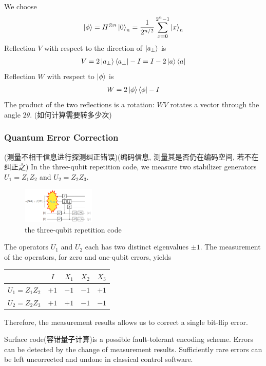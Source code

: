 We choose
\begin{align*}
    \ket{\phi}=H^{\otimes n}\ket{0}_n=\frac{1}{2^{n/2}}\sum_{x=0}^{2^n-1}\ket{x}_n
\end{align*}
Reflection $V$ with respect to the direction of $\ket{a_\perp}$ is 
\begin{align*}
    V=2\ket{a_\perp}\bra{a_\perp}-I=I-2\ket{a}\bra{a}
\end{align*}
Reﬂection $W$ with respect to $\ket{\phi}$ is
\begin{align*}
    W=2\ket{\phi}\bra{\phi}-I
\end{align*}
The product of the two reﬂections is a rotation: $WV$ rotates a vector through the angle $2\theta$. (如何计算需要转多少次)

\subsubsection{Quantum Error Correction}
(测量不相干信息进行探测纠正错误)(编码信息, 测量其是否仍在编码空间, 若不在纠正之)
In the three-qubit repetition code, we measure two stabilizer generators $U_1=Z_1Z_2$ and $U_2=Z_2Z_3$. 

\begin{figure}[!htb]
    \centering
    \includegraphics[width=0.309\textwidth]{pic/Review/the three-qubit repetition code}
    \caption{the three-qubit repetition code}
\end{figure}

The operators $U_1$ and $U_2$ each has two distinct eigenvalues $\pm1$. The measurement of the operators, for zero and one-qubit errors, yields
\begin{table}[htb]
    \centering
    \begin{tabular}[c]{ccccc}\toprule
        & $I$ & $X_1$ & $X_2$ & $X_3$\\ \midrule
        $U_1=Z_1Z_2$ & $+1$ & $-1$ & $-1$ & $+1$\\ 
        $U_2=Z_2Z_3$ & $+1$ & $+1$ & $-1$ & $-1$\\ \bottomrule
    \end{tabular}
\end{table}
Therefore, the measurement results allows us to correct a single bit-flip error.


Surface code(容错量子计算)is a possible fault-tolerant encoding scheme. Errors can be detected by the change of measurement results. Suﬃciently rare errors can be left uncorrected and undone in classical control software.

